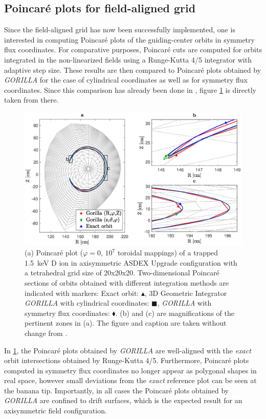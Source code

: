 \documentclass[./main.tex]{subfiles}
\begin{document}
\newpage 
\subsection{Poincar\'e plots for field-aligned grid}
Since the field-aligned grid has now been successfully implemented, one is interested in computing Poincar\'e plots of the guiding-center orbits in symmetry flux coordinates. For comparative purposes, Poincar\'e cuts are computed for orbits integrated in the non-linearized fields using a Runge-Kutta 4/5 integrator with adaptive step size. These results are then compared to Poincar\'e plots obtained by \textit{GORILLA} for the case of cylindrical coordinates as well as for symmetry flux coordinates. Since this comparison has already been done in \cite{paper_gorilla}, figure \ref{fig:Poincare_field_aligned} is directly taken from there. 
\begin{figure}[h]
\begin{center}
	\includegraphics[width=1\textwidth]{figures/orbit_comparison.eps}
\end{center}
	\caption{(a) Poincar\'e plot ($\varphi=0$, $10^7$ toroidal mappings) of a trapped 1.5~keV D ion in axisymmetric ASDEX Upgrade configuration with a tetrahedral grid size of 20x20x20. Two-dimensional Poincar\'e sections of orbits obtained with different integration methods are indicated with markers: Exact orbit: $\blacktriangle$, 3D Geometric Integrator \textit{GORILLA} with cylindrical coordinates: $\blacksquare$, \textit{GORILLA} with symmetry flux coordinates: $\blacklozenge$. (b) and (c) are magnifications of the pertinent zones in (a). The figure and caption are taken without change from \cite{paper_gorilla}.}
		\label{fig:Poincare_field_aligned}
\end{figure}

In \ref{fig:Poincare_field_aligned}, the Poincar\'e plots obtained by \textit{GORILLA} are well-aligned with the \textit{exact} orbit intersections obtained by Runge-Kutta 4/5. Furthermore, Poincar\'e plots computed in symmetry flux coordinates no longer appear as polygonal shapes in real space, however small deviations from the \textit{exact} reference plot can be seen at the banana tip. Importantly, in all cases the Poincar\'e plots obtained by \textit{GORILLA} are confined to drift surfaces, which is the expected result for an axisymmetric field configuration.
\end{document}
